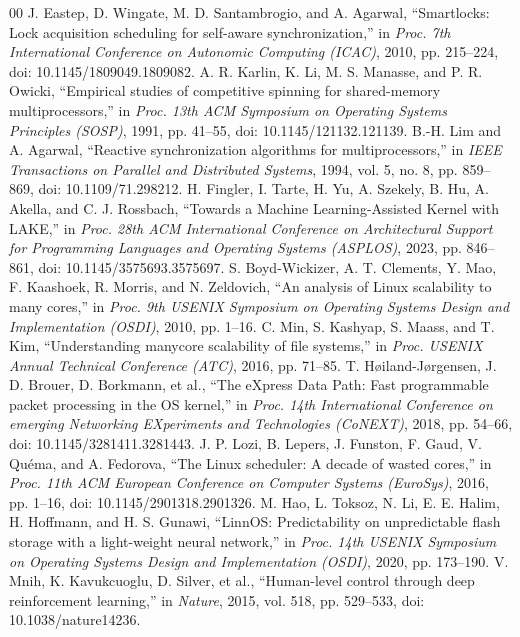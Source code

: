 \documentclass[conference]{IEEEtran}
\begin{document}
\begin{thebibliography}{00}
 J. Eastep, D. Wingate, M. D. Santambrogio, and A. Agarwal, ``Smartlocks: Lock acquisition scheduling for self-aware synchronization,'' in \textit{Proc. 7th International Conference on Autonomic Computing (ICAC)}, 2010, pp. 215--224, doi: 10.1145/1809049.1809082.
 A. R. Karlin, K. Li, M. S. Manasse, and P. R. Owicki, ``Empirical studies of competitive spinning for shared-memory multiprocessors,'' in \textit{Proc. 13th ACM Symposium on Operating Systems Principles (SOSP)}, 1991, pp. 41--55, doi: 10.1145/121132.121139.
 B.-H. Lim and A. Agarwal, ``Reactive synchronization algorithms for multiprocessors,'' in \textit{IEEE Transactions on Parallel and Distributed Systems}, 1994, vol. 5, no. 8, pp. 859--869, doi: 10.1109/71.298212.
 H. Fingler, I. Tarte, H. Yu, A. Szekely, B. Hu, A. Akella, and C. J. Rossbach, ``Towards a Machine Learning-Assisted Kernel with LAKE,'' in \textit{Proc. 28th ACM International Conference on Architectural Support for Programming Languages and Operating Systems (ASPLOS)}, 2023, pp. 846--861, doi: 10.1145/3575693.3575697.
 S. Boyd-Wickizer, A. T. Clements, Y. Mao, F. Kaashoek, R. Morris, and N. Zeldovich, ``An analysis of Linux scalability to many cores,'' in \textit{Proc. 9th USENIX Symposium on Operating Systems Design and Implementation (OSDI)}, 2010, pp. 1--16.
 C. Min, S. Kashyap, S. Maass, and T. Kim, ``Understanding manycore scalability of file systems,'' in \textit{Proc. USENIX Annual Technical Conference (ATC)}, 2016, pp. 71--85.
 T. H{\o}iland-J{\o}rgensen, J. D. Brouer, D. Borkmann, et al., ``The eXpress Data Path: Fast programmable packet processing in the OS kernel,'' in \textit{Proc. 14th International Conference on emerging Networking EXperiments and Technologies (CoNEXT)}, 2018, pp. 54--66, doi: 10.1145/3281411.3281443.
 J. P. Lozi, B. Lepers, J. Funston, F. Gaud, V. Qu\'{e}ma, and A. Fedorova, ``The Linux scheduler: A decade of wasted cores,'' in \textit{Proc. 11th ACM European Conference on Computer Systems (EuroSys)}, 2016, pp. 1--16, doi: 10.1145/2901318.2901326.
 M. Hao, L. Toksoz, N. Li, E. E. Halim, H. Hoffmann, and H. S. Gunawi, ``LinnOS: Predictability on unpredictable flash storage with a light-weight neural network,'' in \textit{Proc. 14th USENIX Symposium on Operating Systems Design and Implementation (OSDI)}, 2020, pp. 173--190.
 V. Mnih, K. Kavukcuoglu, D. Silver, et al., ``Human-level control through deep reinforcement learning,'' in \textit{Nature}, 2015, vol. 518, pp. 529--533, doi: 10.1038/nature14236.

\end{thebibliography}
\end{document}
